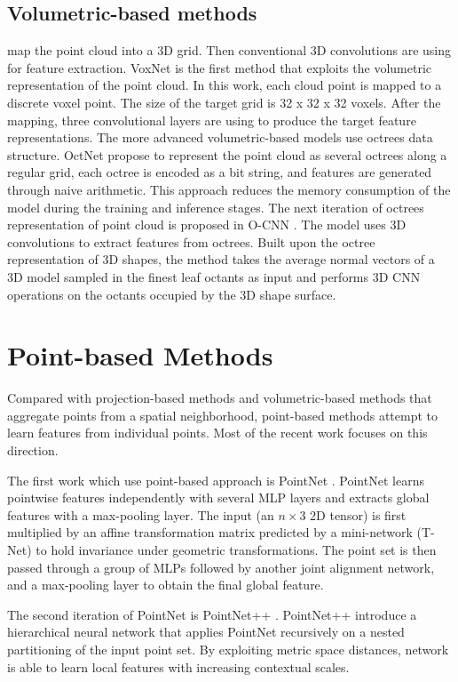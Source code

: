 \subsection{Volumetric-based methods} map the point cloud into a 3D grid. Then conventional 3D convolutions are using for feature extraction.
VoxNet \cite{maturana_voxnet_2015} is the first method that exploits the volumetric representation of the point cloud. In this work, each cloud point is mapped to a discrete voxel point. The size of the target grid is 32 x 32 x 32 voxels. After the mapping, three convolutional layers are using to produce the target feature representations.
The more advanced volumetric-based models use octrees data structure. OctNet \cite{riegler_octnet_2017} propose to represent the point cloud as several octrees along a regular grid, each octree is encoded as a bit string, and features are generated through naive arithmetic. This approach reduces the memory consumption of the model during the training and inference stages.
The next iteration of octrees representation of point cloud is proposed in O-CNN \cite{wang_o-cnn_2017}. The model uses 3D convolutions to extract features from octrees. Built upon the octree representation of 3D shapes, the method takes the average normal vectors of a 3D model sampled in the finest leaf octants as input and performs 3D CNN operations on the octants occupied by the 3D shape surface.

\section{Point-based Methods}
Compared with projection-based methods and volumetric-based methods that aggregate points from a spatial neighborhood, point-based methods attempt to learn features from individual points. Most of the recent work focuses on this direction.

The first work which use point-based approach is PointNet \cite{qi_pointnet_2017}. PointNet learns pointwise features independently with several MLP layers and extracts global features with a max-pooling layer. The input (an $n \times 3$ 2D tensor) is first multiplied by an affine transformation matrix predicted by a mini-network (T-Net) to hold invariance under geometric transformations. The point set is then passed through a group of MLPs followed by another joint alignment network, and a max-pooling layer to obtain the final global feature.

The second iteration of PointNet is PointNet++ \cite{qi_pointnet_2017-1}. PointNet++ introduce a hierarchical neural network that applies PointNet recursively on a nested partitioning of the input point set. By exploiting metric space distances, network is able to learn local features with increasing contextual scales.

